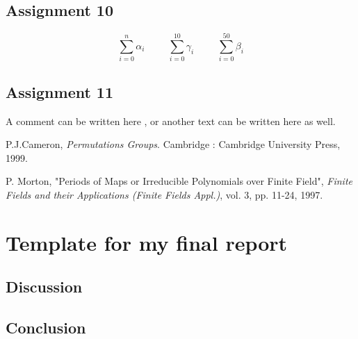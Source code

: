 \documentclass{article}
\newcommand{\summation}[2]{\sum_{i=0}^{#1}{#2}_i}
\begin{document}
\subsection*{Assignment 10}
\begin{equation}
\summation{n}{\alpha}
\hspace{1cm}
\summation{10}{\gamma}
\hspace{1cm}
\summation{50}{\beta}
\end{equation}

\subsection{Assignment 11}
A comment can be written here\cite{Peter J.Cameron} ,  or another text can be written here as well\cite{Patrick Morton}.



\begin{thebibliography}{2}
P.J.Cameron, \emph{Permutations Groups}. Cambridge : Cambridge University Press, 1999.

 P. Morton, "Periods of Maps or Irreducible Polynomials over Finite Field", \emph{Finite Fields and their Applications (Finite Fields Appl.)}, vol. 3, pp. 11-24, 1997.
\end{thebibliography}


\section{Template for my final report}
\subsection{Discussion}

\subsection{Conclusion}
\end{document}
